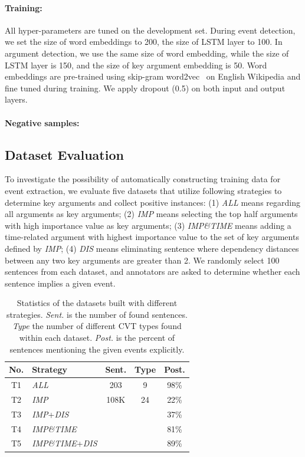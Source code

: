 \paragraph{Training:} All hyper-parameters are tuned on the development set. During event detection, we set the size of word embeddings to 200, the size of LSTM layer to 100. In argument detection, we use the same size of word embedding, while the size of LSTM layer is 150, and the size of key argument embedding is 50. Word embeddings are pre-trained using skip-gram word2vec~\cite{mikolov2013distributed} on English Wikipedia and fine tuned during training. We apply dropout (0.5) on both input and output layers.

\paragraph{Negative samples:} 

\subsection{Dataset Evaluation}\label{sec:evalhypo}
To investigate the possibility of automatically constructing training data for event extraction, we evaluate five datasets that utilize  following strategies to determine key arguments and collect positive instances: (1) \emph{ALL} means regarding all arguments as key arguments; (2) \emph{IMP} means selecting the top half arguments with high importance value as key arguments; (3) \emph{IMP\&TIME} means adding a time-related argument with highest importance value to the set of key arguments defined by \emph{IMP}; (4) \emph{DIS} means eliminating sentence where dependency distances between any two key arguments are greater than 2. We randomly select 100 sentences from each dataset, and annotators are asked to determine whether each sentence implies a given event.

\begin{table}[h]
\small
\centering
\begin{tabular}{|c|l|c|c|c|} \hline
	No. & Strategy & Sent. & Type & Post. \\ \hline
	T1 & \emph{ALL} & 203 & 9 & 98\% \\ \hline
	T2 & \emph{IMP} & 108K & 24 & 22\% \\ \hline
	T3 & \emph{IMP}+\emph{DIS} &  &  & 37\% \\ \hline
	T4 & \emph{IMP\&TIME} &  &  & 81\% \\ \hline
	T5 & \emph{IMP\&TIME}+\emph{DIS} &  &  & 89\% \\ \hline
\end{tabular}
\caption{Statistics of the datasets built with different strategies. 
\textit{Sent.} is the number of found sentences. \textit{Type} the number of different CVT types found within each dataset.  \textit{Post.} is the percent of sentences mentioning the given events explicitly. \label{tab:3}}
\end{table}

